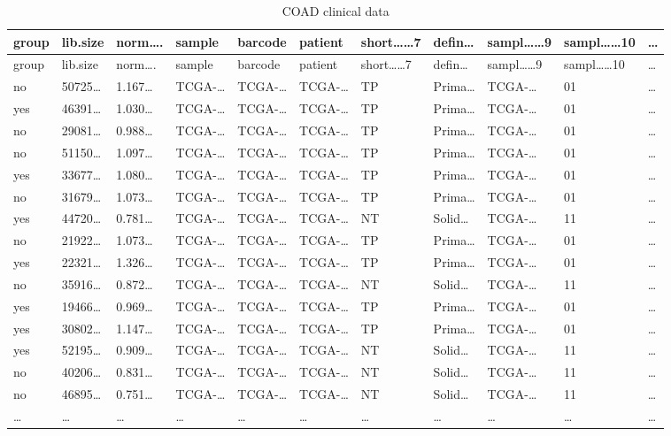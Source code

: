 \documentclass[
]{article}
\begin{document}
\begin{longtable}[]{@{}lllllllllll@{}}
\caption{\label{tab:COAD-clinical-data}COAD clinical data}\tabularnewline
\toprule
group & lib.size & norm\ldots. & sample & barcode & patient & short\ldots\ldots7 & defin\ldots{} & sampl\ldots\ldots9 & sampl\ldots\ldots10 & \ldots{}\tabularnewline
\midrule
\endfirsthead
\toprule
group & lib.size & norm\ldots. & sample & barcode & patient & short\ldots\ldots7 & defin\ldots{} & sampl\ldots\ldots9 & sampl\ldots\ldots10 & \ldots{}\tabularnewline
\midrule
\endhead
no & 50725\ldots{} & 1.167\ldots{} & TCGA-\ldots{} & TCGA-\ldots{} & TCGA-\ldots{} & TP & Prima\ldots{} & TCGA-\ldots{} & 01 & \ldots{}\tabularnewline
yes & 46391\ldots{} & 1.030\ldots{} & TCGA-\ldots{} & TCGA-\ldots{} & TCGA-\ldots{} & TP & Prima\ldots{} & TCGA-\ldots{} & 01 & \ldots{}\tabularnewline
no & 29081\ldots{} & 0.988\ldots{} & TCGA-\ldots{} & TCGA-\ldots{} & TCGA-\ldots{} & TP & Prima\ldots{} & TCGA-\ldots{} & 01 & \ldots{}\tabularnewline
no & 51150\ldots{} & 1.097\ldots{} & TCGA-\ldots{} & TCGA-\ldots{} & TCGA-\ldots{} & TP & Prima\ldots{} & TCGA-\ldots{} & 01 & \ldots{}\tabularnewline
yes & 33677\ldots{} & 1.080\ldots{} & TCGA-\ldots{} & TCGA-\ldots{} & TCGA-\ldots{} & TP & Prima\ldots{} & TCGA-\ldots{} & 01 & \ldots{}\tabularnewline
no & 31679\ldots{} & 1.073\ldots{} & TCGA-\ldots{} & TCGA-\ldots{} & TCGA-\ldots{} & TP & Prima\ldots{} & TCGA-\ldots{} & 01 & \ldots{}\tabularnewline
yes & 44720\ldots{} & 0.781\ldots{} & TCGA-\ldots{} & TCGA-\ldots{} & TCGA-\ldots{} & NT & Solid\ldots{} & TCGA-\ldots{} & 11 & \ldots{}\tabularnewline
no & 21922\ldots{} & 1.073\ldots{} & TCGA-\ldots{} & TCGA-\ldots{} & TCGA-\ldots{} & TP & Prima\ldots{} & TCGA-\ldots{} & 01 & \ldots{}\tabularnewline
yes & 22321\ldots{} & 1.326\ldots{} & TCGA-\ldots{} & TCGA-\ldots{} & TCGA-\ldots{} & TP & Prima\ldots{} & TCGA-\ldots{} & 01 & \ldots{}\tabularnewline
no & 35916\ldots{} & 0.872\ldots{} & TCGA-\ldots{} & TCGA-\ldots{} & TCGA-\ldots{} & NT & Solid\ldots{} & TCGA-\ldots{} & 11 & \ldots{}\tabularnewline
yes & 19466\ldots{} & 0.969\ldots{} & TCGA-\ldots{} & TCGA-\ldots{} & TCGA-\ldots{} & TP & Prima\ldots{} & TCGA-\ldots{} & 01 & \ldots{}\tabularnewline
yes & 30802\ldots{} & 1.147\ldots{} & TCGA-\ldots{} & TCGA-\ldots{} & TCGA-\ldots{} & TP & Prima\ldots{} & TCGA-\ldots{} & 01 & \ldots{}\tabularnewline
yes & 52195\ldots{} & 0.909\ldots{} & TCGA-\ldots{} & TCGA-\ldots{} & TCGA-\ldots{} & NT & Solid\ldots{} & TCGA-\ldots{} & 11 & \ldots{}\tabularnewline
no & 40206\ldots{} & 0.831\ldots{} & TCGA-\ldots{} & TCGA-\ldots{} & TCGA-\ldots{} & NT & Solid\ldots{} & TCGA-\ldots{} & 11 & \ldots{}\tabularnewline
no & 46895\ldots{} & 0.751\ldots{} & TCGA-\ldots{} & TCGA-\ldots{} & TCGA-\ldots{} & NT & Solid\ldots{} & TCGA-\ldots{} & 11 & \ldots{}\tabularnewline
\ldots{} & \ldots{} & \ldots{} & \ldots{} & \ldots{} & \ldots{} & \ldots{} & \ldots{} & \ldots{} & \ldots{} & \ldots{}\tabularnewline
\bottomrule
\end{longtable}
\end{document}
